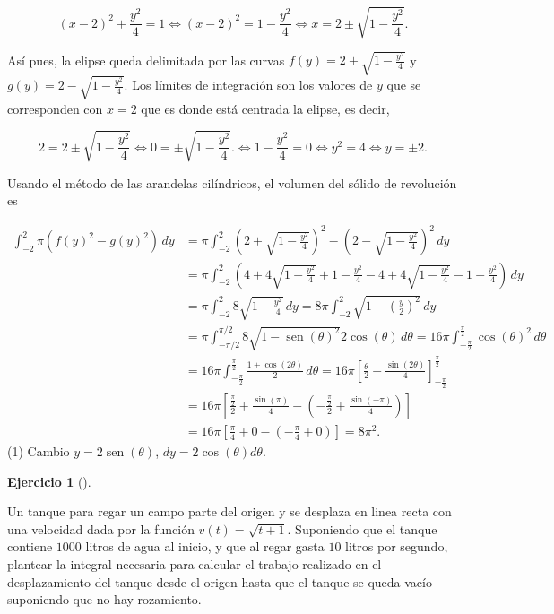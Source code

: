\documentclass[
  spanish,
  a4paper,
]{scrreport}
\theoremstyle{definition}
\newtheorem{exercise}{Ejercicio}[chapter]
\theoremstyle{remark}
\begin{document}
\begin{tcolorbox}
\[
(x-2)^2+\frac{y^2}{4} = 1
\Leftrightarrow  (x-2)^2 = 1-\frac{y^2}{4}
\Leftrightarrow x = 2 \pm \sqrt{1-\frac{y^2}{4}}.
\]

Así pues, la elipse queda delimitada por las curvas
\(f(y) = 2+\sqrt{1-\frac{y^2}{4}}\) y
\(g(y) = 2-\sqrt{1-\frac{y^2}{4}}\). Los límites de integración son los
valores de \(y\) que se corresponden con \(x=2\) que es donde está
centrada la elipse, es decir,

\[
2 = 2 \pm \sqrt{1-\frac{y^2}{4}}
\Leftrightarrow 0 = \pm \sqrt{1-\frac{y^2}{4}}.
\Leftrightarrow 1-\frac{y^2}{4} = 0
\Leftrightarrow y^2 = 4
\Leftrightarrow y = \pm 2.
\]

Usando el método de las arandelas cilíndricos, el volumen del sólido de
revolución es

\begin{align*}
\int_{-2}^2 \pi (f(y)^2 -g(y)^2)\,dy
&= \pi \int_{-2}^2 \left(2+\sqrt{1-\frac{y^2}{4}}\right)^2 - \left(2-\sqrt{1-\frac{y^2}{4}}\right)^2 \,dy \\
&= \pi \int_{-2}^2 \left(4+4\sqrt{1-\frac{y^2}{4}} + 1-\frac{y^2}{4} - 4 + 4\sqrt{1-\frac{y^2}{4}} - 1+\frac{y^2}{4}\right) \,dy \\
&= \pi \int_{-2}^2 8\sqrt{1-\frac{y^2}{4}} \,dy
=8\pi \int_{-2}^2 \sqrt{1-\left(\frac{y}{2}\right)^2} \,dy \tag{1} \\
&= \pi \int_{-\pi/2}^{\pi/2} 8\sqrt{1-\operatorname{sen}(\theta)^2} 2\cos(\theta)\,d\theta
= 16\pi \int_{-\frac{\pi}{2}}^{\frac{\pi}{2}} \cos(\theta)^2\,d\theta \\
&= 16\pi \int_{-\frac{\pi}{2}}^{\frac{\pi}{2}} \frac{1+\cos(2\theta)}{2}\,d\theta
= 16\pi \left[\frac{\theta}{2} + \frac{\sin(2\theta)}{4}\right]_{-\frac{\pi}{2}}^{\frac{\pi}{2}} \\
&= 16\pi \left[\frac{\frac{\pi}{2}}{2} + \frac{\sin(\pi)}{4} - \left(-\frac{\frac{\pi}{2}}{2} + \frac{\sin(-\pi)}{4}\right)\right] \\
&= 16\pi \left[\frac{\pi}{4} + 0 - \left(-\frac{\pi}{4} + 0\right)\right]
= 8\pi^2.
\end{align*} (1) Cambio \(y = 2\operatorname{sen}(\theta)\),
\(dy = 2\cos(\theta)d\theta\).

\end{tcolorbox}

\begin{exercise}[]\protect\hypertarget{exr-4}{}\label{exr-4}

Un tanque para regar un campo parte del origen y se desplaza en linea
recta con una velocidad dada por la función \(v(t) = \sqrt{t+1}\).
Suponiendo que el tanque contiene \(1000\) litros de agua al inicio, y
que al regar gasta \(10\) litros por segundo, plantear la integral
necesaria para calcular el trabajo realizado en el desplazamiento del
tanque desde el origen hasta que el tanque se queda vacío suponiendo que
no hay rozamiento.

\end{exercise}
\end{document}

